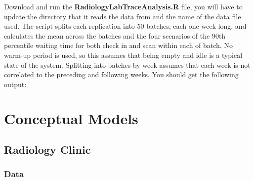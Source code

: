 \documentclass[
  10pt,
  a4paperpaper,
  DIV=11,
  numbers=noendperiod,
  oneside]{scrreprt}
\begin{document}
Download and run the \textbf{RadiologyLabTraceAnalysis.R} file, you will
have to update the directory that it reads the data from and the name of
the data file used. The script splits each replication into 50 batches,
each one week long, and calculates the mean across the batches and the
four scenarios of the 90th percentile waiting time for both check in and
scan within each of batch. No warm-up period is used, so this assumes
that being empty and idle is a typical state of the system. Splitting
into batches by week assumes that each week is not correlated to the
preceding and following weeks. You should get the following output:

\part{Conceptual Models}

\chapter{Radiology Clinic}\label{sec-radiology_cm}

\section{Data}\label{data}

\begin{table}

\caption{\label{tbl-var_lab1}List of Global Variables}


\end{table}%
\end{document}

